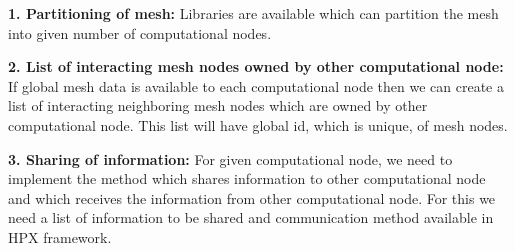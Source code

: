 \documentclass[11pt,twocolumn]{amsart}
\theoremstyle{definition}
\theoremstyle{definition}
\numberwithin{equation}{section}
\numberwithin{equation}{section}
\begin{document}
\noindent \textbf{1. Partitioning of mesh: }Libraries are available which can partition the mesh into given number of computational nodes.

\noindent \textbf{2. List of interacting mesh nodes owned by other computational node: }If global mesh data is available to each computational node then we can create a list of interacting neighboring mesh nodes which are owned by other computational node. This list will have global id, which is unique, of mesh nodes. 

\noindent \textbf{3. Sharing of information: }For given computational node, we need to implement the method which shares information to other computational node and which receives the information from other computational node. For this we need a list of information to be shared and communication method available in HPX framework.
\end{document}
